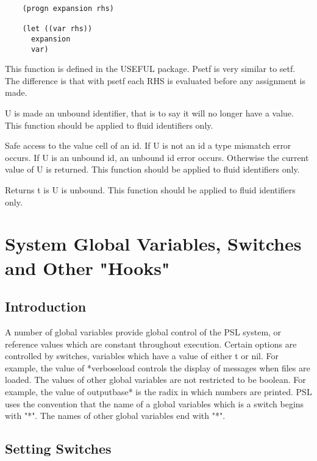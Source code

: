 \begin{verbatim}
    (progn expansion rhs)

    (let ((var rhs))
      expansion
      var)
\end{verbatim}
{    This  function  is  defined in the USEFUL package.  Psetf is
    very similar to setf.  The difference  is  that  with  psetf
    each RHS is evaluated before any assignment is made.
}

{    U  is  made an unbound identifier, that is to say it will no
    longer have a value.  This function  should  be  applied  to
    fluid identifiers only.
}

{    Safe access to the value cell of an id.  If U is not an id a
    type  mismatch  error  occurs.    If  U is an unbound id, an
    unbound id error occurs.  Otherwise the current value  of  U
    is  returned.    This  function  should  be applied to fluid
    identifiers only.
}

{    Returns t is U is unbound.  This function should be  applied
    to fluid identifiers only.
}
\section{System Global Variables, Switches and Other "Hooks"}

\subsection{Introduction}

  A number of global variables provide global control of the PSL
system,  or  reference  values  which  are  constant  throughout
execution.   Certain  options  are   controlled   by   switches,
variables  which  have a value of either t or nil.  For example,
the value of *verboseload controls the display of messages  when
files  are loaded.  The values of other global variables are not
restricted to be boolean.  For example, the value of outputbase*
is the radix  in  which  numbers  are  printed.   PSL  uses  the
convention that the name of a global variables which is a switch
begins  with  "*".  The names of other global variables end with
"*".  

\subsection{Setting Switches}

